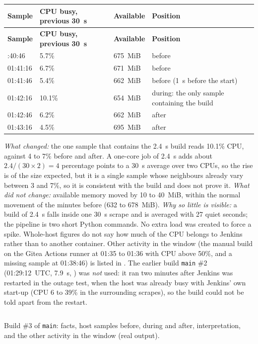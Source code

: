 \begin{tabularx}{\linewidth}{L{3.2cm}L{3.4cm}L{2.6cm}Y}
\caption{Host CPU and available memory around build \#3 (UTC, 30~s samples)\label{Table:SreBuildSamples}}\\
\toprule \textbf{Sample} & \textbf{CPU busy, previous 30~s} & \textbf{Available} & \textbf{Position}\\ \midrule
\endfirsthead
\toprule \textbf{Sample} & \textbf{CPU busy, previous 30~s} & \textbf{Available} & \textbf{Position}\\ \midrule
\endhead \bottomrule {}:40:46 & 5.7\% & 675~MiB & before\\
01:41:16 & 6.7\% & 671~MiB & before\\
01:41:46 & 5.4\% & 662~MiB & before (1~s before the start)\\
01:42:16 & 10.1\% & 654~MiB & during: the only sample containing the build\\
01:42:46 & 6.2\% & 662~MiB & after\\
01:43:16 & 4.5\% & 695~MiB & after\\
\end{tabularx}

\emph{What changed:} the one sample that contains the 2.4~s build reads 10.1\% CPU, against 4 to 7\% before and after. A one-core job of 2.4~s adds about
$2.4/(30\times 2)=4$ percentage points to a 30~s average over two CPUs, so the rise is of the size expected, but it is a single sample whose neighbours already
vary between 3 and 7\%, so it is consistent with the build and does not prove it. \emph{What did not change:} available memory moved by 10 to 40~MiB, within
the normal movement of the minutes before (632 to 678~MiB). \emph{Why so little is visible:} a build of 2.4~s falls inside one 30~s scrape and is averaged with
27 quiet seconds; the pipeline is two short Python commands. No extra load was created to force a spike. Whole-host figures do not say how much of the CPU belongs to
Jenkins rather than to another container. Other activity in the window (the manual build on the Gitea Actions runner at 01:35 to 01:36 with CPU above 50\%, and a missing
sample at 01:38:46) is listed in .
The earlier build \texttt{main} \#2 (01:29:12~UTC, 7.9~s, ) was \emph{not} used: it ran two minutes after Jenkins was restarted in the outage test, when the host was
already busy with Jenkins' own start-up (CPU 6 to 39\% in the surrounding scrapes), so the build could not be told apart from the restart.

\begin{longlisting}
\inputminted[fontsize=\scriptsize]{text}{evidence/168-normal-jenkins-build-3-host-metrics-before-during-after-bd-2026-11-11.txt}
\caption{Build \#3 of \texttt{main}: facts, host samples before, during and after, interpretation, and the other activity in the window (real output).}
\label{Listing:E168}
\end{longlisting}

